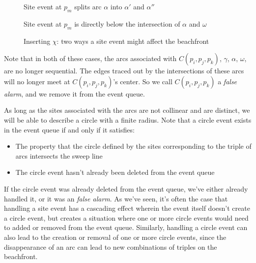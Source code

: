 \documentclass[12pt,twoside]{reedthesis}
\begin{document}
      \begin{figure}[!htb]
        \centering
        \begin{subtable}{0.475\textwidth}
          \centering
          
          \caption{Site event at $p_{m}$ splits arc $\alpha$ into $\alpha'$ and $\alpha''$}
          \label{fig:site_event_cases0}
        \end{subtable}
        \begin{subtable}{0.475\textwidth}
          \centering
          
          \caption{Site event at $p_{m}$ is directly below the intersection of $\alpha$ and $\omega$}
          \label{fig:site_event_cases1}
        \end{subtable}
        \caption{Inserting $\chi$: two ways a site event might affect the beachfront}
        \label{fig:site_event_cases}
      \end{figure}

      Note that in both of these cases, the arcs associated with $C(p_{i}, p_{j}, p_{k})$, $\gamma$, $\alpha$, $\omega$, are no longer sequential. The edges traced out by the intersections of these arcs will no longer meet at $C(p_{i}, p_{j}, p_{k})$'s center. So we call $C(p_{i}, p_{j}, p_{k})$ a \emph{false alarm}, and we remove it from the event queue.

      As long as the sites associated with the arcs are not collinear and are distinct, we will be able to describe a circle with a finite radius. Note that a circle event exists in the event queue if and only if it satisfies:
      \begin{itemize}
      \setlength\itemsep{.5em}
      \item The property that the circle defined by the sites corresponding to the triple of arcs intersects the sweep line
      \item The circle event hasn't already been deleted from the event queue
      \end{itemize}\par
      If the circle event was already deleted from the event queue, we've either already handled it, or it was an \emph{false alarm}. As we've seen, it's often the case that handling a site event has a cascading effect wherein the event itself doesn't create a circle event, but creates a situation where one or more circle events would need to added or removed from the event queue. Similarly, handling a circle event can also lead to the creation or removal of one or more circle events, since the disappearance of an arc can lead to new combinations of triples on the beachfront.\par
\end{document}
